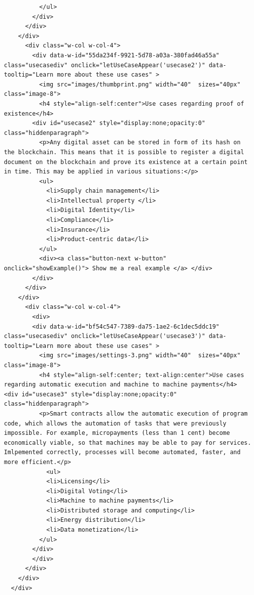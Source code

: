 \begin{lstlisting}
          </ul>
        </div>
      </div>
    </div>
      <div class="w-col w-col-4">
        <div data-w-id="55da234f-9921-5d78-a03a-380fad46a55a" class="usecasediv" onclick="letUseCaseAppear('usecase2')" data-tooltip="Learn more about these use cases" >
          <img src="images/thumbprint.png" width="40"  sizes="40px" class="image-8">
          <h4 style="align-self:center">Use cases regarding proof of existence</h4>
        <div id="usecase2" style="display:none;opacity:0" class="hiddenparagraph">
          <p>Any digital asset can be stored in form of its hash on the blockchain. This means that it is possible to register a digital document on the blockchain and prove its existence at a certain point in time. This may be applied in various situations:</p>
          <ul>
            <li>Supply chain management</li>
            <li>Intellectual property </li>
            <li>Digital Identity</li>
            <li>Compliance</li>
            <li>Insurance</li>
            <li>Product-centric data</li>
          </ul>
          <div><a class="button-next w-button" onclick="showExample()"> Show me a real example </a> </div>
        </div>
      </div>
    </div>
      <div class="w-col w-col-4">
        <div>
        <div data-w-id="bf54c547-7389-da75-1ae2-6c1dec5ddc19" class="usecasediv" onclick="letUseCaseAppear('usecase3')" data-tooltip="Learn more about these use cases" >
          <img src="images/settings-3.png" width="40"  sizes="40px" class="image-8">
          <h4 style="align-self:center; text-align:center">Use cases regarding automatic execution and machine to machine payments</h4>
<div id="usecase3" style="display:none;opacity:0"  class="hiddenparagraph">
          <p>Smart contracts allow the automatic execution of program code, which allows the automation of tasks that were previously impossible. For example, micropayments (less than 1 cent) become economically viable, so that machines may be able to pay for services. Imlpemented correctly, processes will become automated, faster, and more efficient.</p>
            <ul>
            <li>Licensing</li>
            <li>Digital Voting</li>
            <li>Machine to machine payments</li>
            <li>Distributed storage and computing</li>
            <li>Energy distribution</li>
            <li>Data monetization</li>
          </ul>
        </div>
        </div>
      </div>
    </div>
  </div>


\end{lstlisting}
